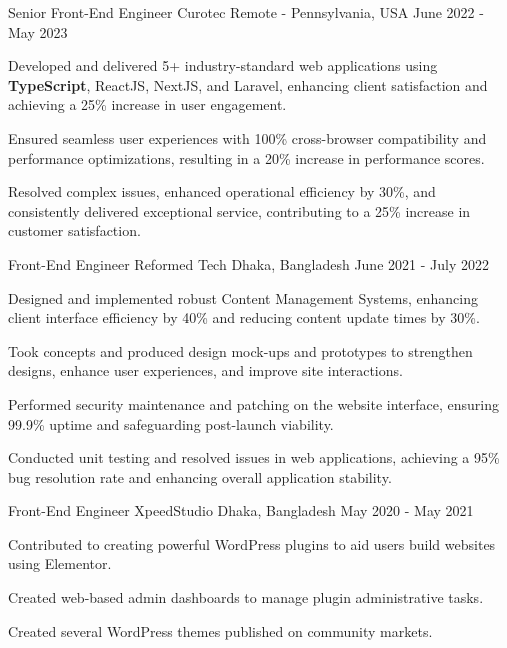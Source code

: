 \begin{cventries}
    \cventry
        {Senior Front-End Engineer}
        {Curotec}
        {Remote - Pennsylvania, USA}
        {June 2022 - May 2023}
        {
            \begin{cvitems}
                \item {Developed and delivered 5+ industry-standard web applications using \textbf{TypeScript}, ReactJS, NextJS, and Laravel, enhancing client satisfaction and achieving a 25\% increase in user engagement.}
                \item {Ensured seamless user experiences with 100\% cross-browser compatibility and performance optimizations, resulting in a 20\% increase in performance scores.}
                \item {Resolved complex issues, enhanced operational efficiency by 30\%, and consistently delivered exceptional service, contributing to a 25\% increase in customer satisfaction.}
            \end{cvitems}
        }

    \cventry
        {Front-End Engineer}
        {Reformed Tech}
        {Dhaka, Bangladesh}
        {June 2021 - July 2022}
        {
            \begin{cvitems}
                \item {Designed and implemented robust Content Management Systems, enhancing client interface efficiency by 40\% and reducing content update times by 30\%.}
                \item {Took concepts and produced design mock-ups and prototypes to strengthen designs, enhance user experiences, and improve site interactions.}
                \item {Performed security maintenance and patching on the website interface, ensuring 99.9\% uptime and safeguarding post-launch viability.}
                \item {Conducted unit testing and resolved issues in web applications, achieving a 95\% bug resolution rate and enhancing overall application stability.}
            \end{cvitems}
        }

    \cventry
        {Front-End Engineer}
        {XpeedStudio}
        {Dhaka, Bangladesh}
        {May 2020 - May 2021}
        {
            \begin{cvitems}
                \item {Contributed to creating powerful WordPress plugins to aid users build websites using Elementor.}
                \item {Created web-based admin dashboards to manage plugin administrative tasks.}
                \item {Created several WordPress themes published on community markets.}
            \end{cvitems}
        }

\end{cventries}

